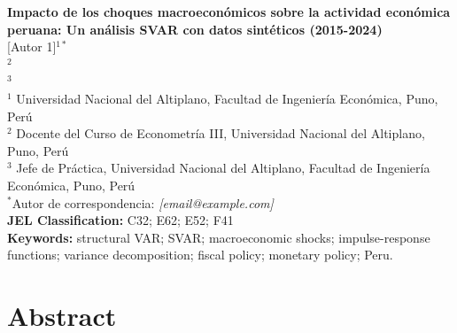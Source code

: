 \documentclass[12pt, a4paper]{article}
\begin{document}
\begin{titlepage}
\centering
\vspace*{2cm}

{\LARGE\bfseries Impacto de los choques macroeconómicos sobre la actividad económica peruana: Un análisis SVAR con datos sintéticos (2015-2024)}\\[1.5cm]

{\large
[Autor 1]$^{1*}$ \\
[Autor 2]$^{2}$ \\
[Autor 3]$^{3}$
}\\[1cm]

{\small
$^{1}$ Universidad Nacional del Altiplano, Facultad de Ingeniería Económica, Puno, Perú \\
$^{2}$ Docente del Curso de Econometría III, Universidad Nacional del Altiplano, Puno, Perú \\
$^{3}$ Jefe de Práctica, Universidad Nacional del Altiplano, Facultad de Ingeniería Económica, Puno, Perú
}\\[1cm]

{\small $^{*}$Autor de correspondencia: \textit{[email@example.com]}}\\[1.5cm]

{\small
\textbf{JEL Classification:} C32; E62; E52; F41 \\
\textbf{Keywords:} structural VAR; SVAR; macroeconomic shocks; impulse-response functions; variance decomposition; fiscal policy; monetary policy; Peru.
}\\[1.5cm]

\vfill
\end{titlepage}

\section*{Abstract}
\end{document}

